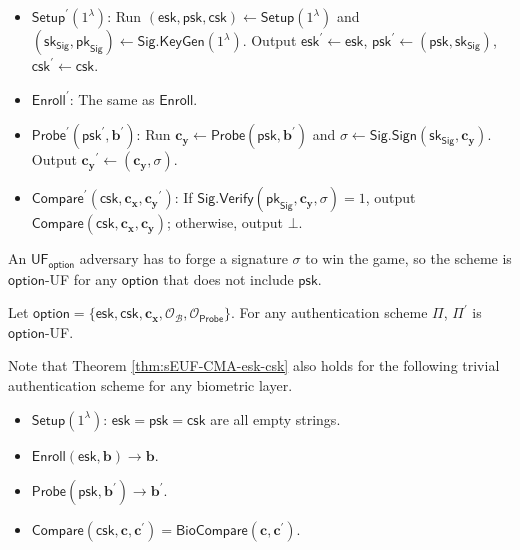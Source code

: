 \begin{itemize}

	\item $\textsf{Setup}^\prime (1^\lambda)$: Run $(\textsf{esk}, \textsf{psk}, \textsf{csk}) \gets \textsf{Setup}(1^\lambda)$ and $(\textsf{sk}_{\textsf{Sig}}, \textsf{pk}_{\textsf{Sig}}) \gets \textsf{Sig.KeyGen}(1^\lambda)$. Output $\textsf{esk}^\prime \gets \textsf{esk}$, $\textsf{psk}^\prime \gets (\textsf{psk}, \textsf{sk}_{\textsf{Sig}})$, $\textsf{csk}^\prime \gets \textsf{csk}$.

	\item $\textsf{Enroll}^\prime$: The same as $\textsf{Enroll}$.

	\item $\textsf{Probe}^\prime (\textsf{psk}^\prime, \mathbf{b}^\prime)$: Run $\mathbf{c_y} \gets \textsf{Probe}(\textsf{psk}, \mathbf{b}^\prime)$ and $\sigma \gets \textsf{Sig.Sign}(\textsf{sk}_{\textsf{Sig}}, \mathbf{c_y})$. Output $\mathbf{c_y}^\prime \gets (\mathbf{c_y}, \sigma)$.

	\item $\textsf{Compare}^\prime (\textsf{csk}, \mathbf{c_x}, \mathbf{c_y}^\prime)$: If $\textsf{Sig.Verify}(\textsf{pk}_{\textsf{Sig}}, \mathbf{c_y}, \sigma) = 1$, output $\textsf{Compare}(\textsf{csk}, \mathbf{c_x}, \mathbf{c_y})$; otherwise, output $\bot$.

\end{itemize}

An $\textsf{UF}_\textsf{option}$ adversary has to forge a signature $\sigma$ to win the game, so the scheme is $\textsf{option}$-UF for any $\textsf{option}$ that does not include $\textsf{psk}$. 

\begin{theorem}
\label{thm:sEUF-CMA-esk-csk}
	Let $\textsf{option} = \{ \textsf{esk}, \textsf{csk}, \mathbf{c_x}, \mathcal{O}_\mathcal{B}, \mathcal{O}_{\textsf{Probe}} \}$. For any authentication scheme $\Pi$, $\Pi^\prime$ is $\textsf{option}$-UF. 
\end{theorem}

Note that Theorem \ref{thm:sEUF-CMA-esk-csk} also holds for the following trivial authentication scheme for any biometric layer.
\begin{itemize}
	\item $\textsf{Setup} (1^\lambda)$: $\textsf{esk} = \textsf{psk} = \textsf{csk}$ are all empty strings.
	\item $\textsf{Enroll} (\textsf{esk}, \mathbf{b}) \to \mathbf{b}$.
	\item $\textsf{Probe} (\textsf{psk}, \mathbf{b}^\prime) \to \mathbf{b}^\prime$.
	\item $\textsf{Compare} (\textsf{csk}, \mathbf{c}, \mathbf{c}^\prime) = \textsf{BioCompare}(\mathbf{c}, \mathbf{c}^\prime)$.
\end{itemize}



